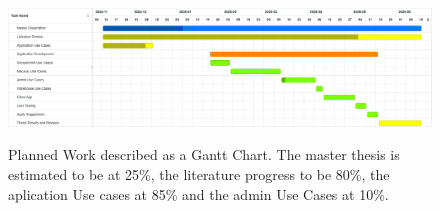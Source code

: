     \begin{figure}[h]
      \caption{Planned Work described as a Gantt Chart. The master thesis is estimated to be at 25\%, the literature progress to be 80\%, the aplication Use cases at 85\% and the admin Use Cases at 10\%.}
      \centering
      \includegraphics[width=\textwidth]{figs/Gantt}
      \label{fig:figure1}
    \end{figure}
